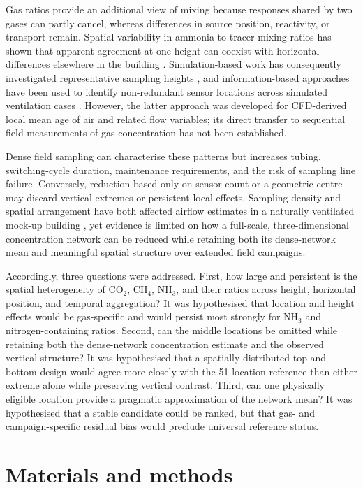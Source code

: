 \documentclass[12pt,a4paper]{article}
\begin{document}
Gas ratios provide an additional view of mixing because responses shared by
two gases can partly cancel, whereas differences in source position,
reactivity, or transport remain. Spatial variability in ammonia-to-tracer
mixing ratios has shown that apparent agreement at one height can coexist with
horizontal differences elsewhere in the building \citep{Mendes2015}.
Simulation-based work has consequently investigated representative sampling
heights \citep{Doumbia2021}, and information-based approaches have been used
to identify non-redundant sensor locations across simulated ventilation cases
\citep{Chen2026}. However, the latter approach was developed for
CFD-derived local mean age of air and related flow variables; its direct
transfer to sequential field measurements of gas concentration has not been
established.

Dense field sampling can characterise these patterns but increases tubing,
switching-cycle duration, maintenance requirements, and the risk of sampling
line failure. Conversely, reduction based only on sensor count or a geometric
centre may discard vertical extremes or persistent local effects. Sampling
density and spatial arrangement have both affected airflow estimates in a
naturally ventilated mock-up building \citep{DeVogeleer2017}, yet evidence is
limited on how a full-scale, three-dimensional concentration network can be
reduced while retaining both its dense-network mean and meaningful spatial
structure over extended field campaigns.

Accordingly, three questions were addressed. First, how large and persistent
is the spatial heterogeneity of \(\mathrm{CO_2}\), \(\mathrm{CH_4}\),
\(\mathrm{NH_3}\), and their ratios across height, horizontal position, and
temporal aggregation? It was hypothesised that location and height effects
would be gas-specific and would persist most strongly for \(\mathrm{NH_3}\)
and nitrogen-containing ratios. Second, can the middle locations be omitted
while retaining both the dense-network concentration estimate and the
observed vertical structure? It was hypothesised that a spatially distributed
top-and-bottom design would agree more closely with the 51-location reference
than either extreme alone while preserving vertical contrast. Third, can one
physically eligible location provide a pragmatic approximation of the network
mean? It was hypothesised that a stable candidate could be ranked, but that
gas- and campaign-specific residual bias would preclude universal reference
status.

\section{Materials and methods}
\end{document}
